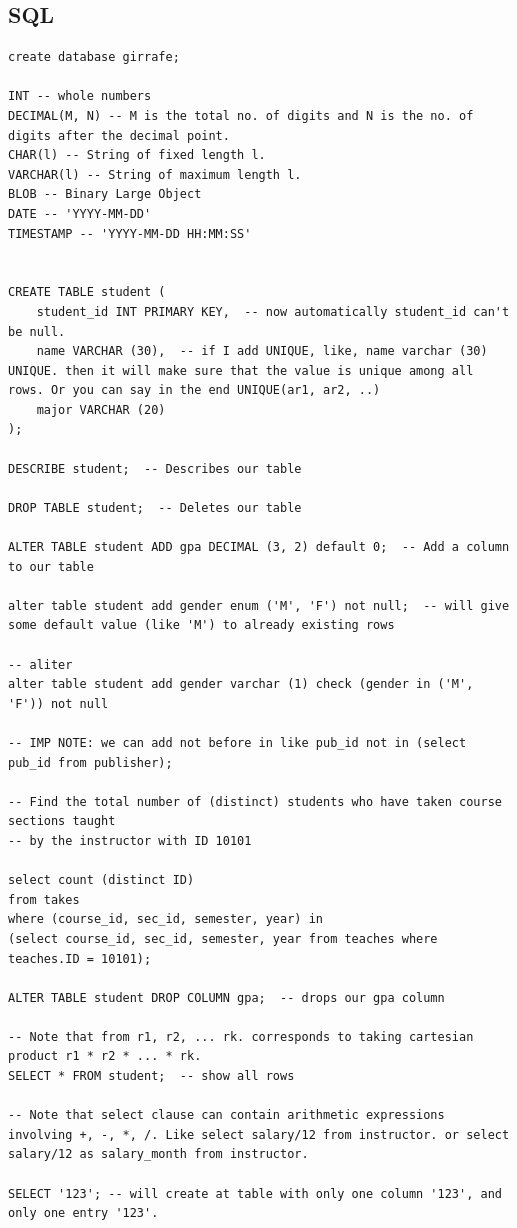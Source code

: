 \documentclass[8pt, a4paper, oneside, twocolumn]{extarticle}
\begin{document}
\subsection{SQL}
\begin{verbatim}
create database girrafe;

INT -- whole numbers
DECIMAL(M, N) -- M is the total no. of digits and N is the no. of digits after the decimal point.
CHAR(l) -- String of fixed length l.
VARCHAR(l) -- String of maximum length l.
BLOB -- Binary Large Object
DATE -- 'YYYY-MM-DD'
TIMESTAMP -- 'YYYY-MM-DD HH:MM:SS'


CREATE TABLE student (
    student_id INT PRIMARY KEY,  -- now automatically student_id can't be null.
    name VARCHAR (30),  -- if I add UNIQUE, like, name varchar (30) UNIQUE. then it will make sure that the value is unique among all rows. Or you can say in the end UNIQUE(ar1, ar2, ..)
    major VARCHAR (20)
);

DESCRIBE student;  -- Describes our table

DROP TABLE student;  -- Deletes our table

ALTER TABLE student ADD gpa DECIMAL (3, 2) default 0;  -- Add a column to our table

alter table student add gender enum ('M', 'F') not null;  -- will give some default value (like 'M') to already existing rows

-- aliter
alter table student add gender varchar (1) check (gender in ('M', 'F')) not null

-- IMP NOTE: we can add not before in like pub_id not in (select pub_id from publisher);

-- Find the total number of (distinct) students who have taken course sections taught
-- by the instructor with ID 10101

select count (distinct ID)
from takes
where (course_id, sec_id, semester, year) in
(select course_id, sec_id, semester, year from teaches where teaches.ID = 10101);

ALTER TABLE student DROP COLUMN gpa;  -- drops our gpa column

-- Note that from r1, r2, ... rk. corresponds to taking cartesian product r1 * r2 * ... * rk.
SELECT * FROM student;  -- show all rows

-- Note that select clause can contain arithmetic expressions involving +, -, *, /. Like select salary/12 from instructor. or select salary/12 as salary_month from instructor.

SELECT '123'; -- will create at table with only one column '123', and only one entry '123'.


\end{verbatim}
\end{document}
